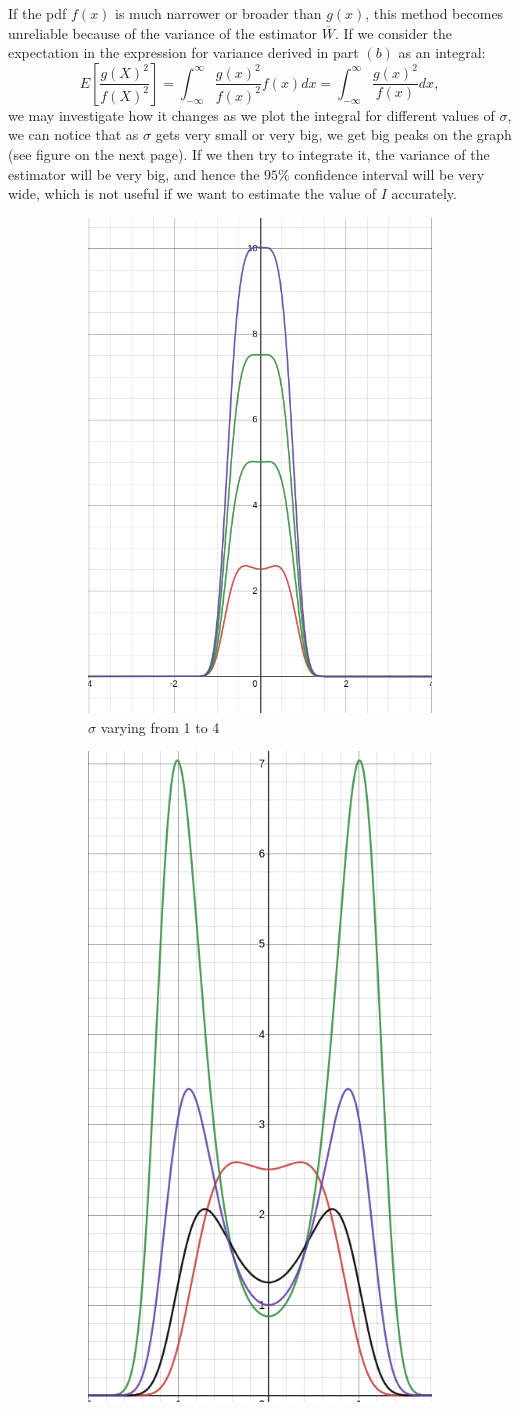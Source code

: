 \documentclass[12pt]{article}
\newcommand\intR{\int_{-\infty}^\infty}
\begin{document}
If the pdf $f(x)$ is much narrower or broader than $g(x)$, 
this method becomes unreliable because of the variance of the estimator $\overline{W}$. 
If we consider the expectation in the expression for variance derived in part $(b)$ as an
integral:
\[ E \left[ \frac{g(X)^2}{f(X)^2} \right] = \intR \frac{g(x)^2}{f(x)^2} f(x)dx = \intR \frac{g(x)^2}{f(x)}dx, \]
we may investigate how it changes as we plot the integral for different values of $\sigma$, we can notice that as
$\sigma$ gets very small or very big, we get big peaks on the graph (see figure on the next page). 
If we then try to integrate it, the variance of the estimator will be very big, 
and hence the $95\%$ confidence interval will be very wide,  
which is not useful if we want to estimate the value of $I$ accurately.
\begin{figure}[H]
\centering
\begin{subfigure}{.5\textwidth}
\centering
\includegraphics[width=.6\linewidth]{integral1.png}
\caption{$\sigma$ varying from 1 to 4}
\label{fig:sub1}
\end{subfigure}%
\begin{subfigure}{.5\textwidth}
\centering
\includegraphics[width=.45\linewidth]{integral2.png}

\end{subfigure}
\end{figure}
\end{document}
